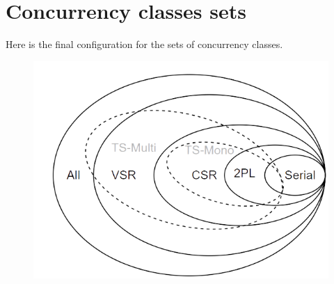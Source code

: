 \section{Concurrency classes sets}

Here is the final configuration for the sets of concurrency classes.
\begin{figure}[H]
    \centering
    \includegraphics[width=0.75\linewidth]{images/set.png}
\end{figure}